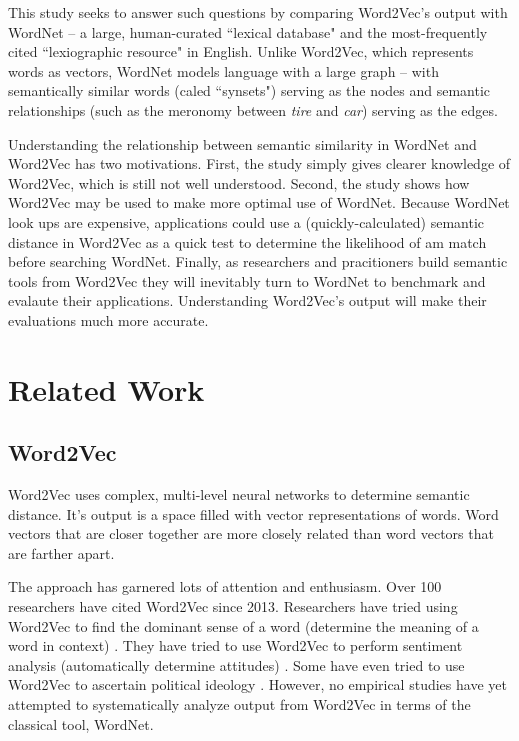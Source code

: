 \documentclass{article}
\begin{document}
This study seeks to answer such questions by comparing Word2Vec's output with WordNet -- a large, human-curated ``lexical database" \cite{Wordnetwebsite} and the most-frequently cited ``lexiographic resource" \cite{widdows} in English. Unlike Word2Vec, which represents words as vectors, WordNet models language with a large graph -- with semantically similar words (caled ``synsets") serving as the nodes and semantic relationships (such as the meronomy between \textit{tire} and \textit{car}) serving as the edges. 

Understanding the relationship between semantic similarity in WordNet and Word2Vec has two motivations. First, the study simply gives clearer knowledge of Word2Vec, which is still not well understood. Second, the study shows how Word2Vec may be used to make more optimal use of WordNet. Because WordNet look ups are expensive, applications could use a (quickly-calculated) semantic distance in Word2Vec as a quick test to determine the likelihood of am match before searching WordNet. Finally, as researchers and pracitioners build semantic tools from Word2Vec they will inevitably turn to WordNet to benchmark and evalaute their applications. Understanding Word2Vec's output will make their evaluations much more accurate. 

\section{Related Work}

\subsection{Word2Vec}
Word2Vec uses complex, multi-level neural networks to determine semantic distance. It's output is a  space filled with vector representations of words. Word vectors that are closer together are more closely related than word vectors that are farther apart. 

The approach has garnered lots of attention and enthusiasm. Over 100 researchers have cited Word2Vec since 2013. Researchers have tried using Word2Vec to find the dominant sense of a word (determine the meaning of a word in context) \cite{wang2014introduction}. They have tried to use Word2Vec to perform sentiment analysis (automatically determine attitudes) \cite{xue2014study}. Some have even tried to use Word2Vec to ascertain political ideology \cite{iyyerpolitical}. However, no empirical studies have yet attempted to systematically analyze output from Word2Vec in terms of the classical tool, WordNet. 
\end{document}

